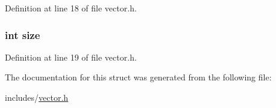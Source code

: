 Definition at line 18 of file vector.\+h.

\hypertarget{structvector_a439227feff9d7f55384e8780cfc2eb82}{
\subsubsection[{size}]{\setlength{\rightskip}{0pt plus 5cm}int size}}\label{structvector_a439227feff9d7f55384e8780cfc2eb82}


Definition at line 19 of file vector.\+h.



The documentation for this struct was generated from the following file\+:\begin{DoxyCompactItemize}
\item 
includes/\hyperlink{vector_8h}{vector.\+h}\end{DoxyCompactItemize}
